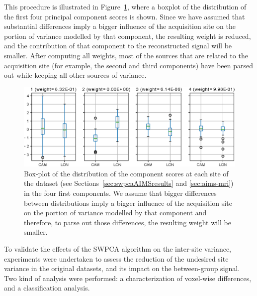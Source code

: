 This procedure is illustrated in Figure~\ref{fig:swpcaboxplot}, where a boxplot of the distribution of the first four principal component scores is shown. Since we have assumed that substantial differences imply a bigger influence of the acquisition site on the portion of variance modelled by that component, the resulting weight is reduced, and the contribution of that component to the reconstructed signal will be smaller. After computing all weights, most of the sources that are related to the acquisition site (for example, the second and third components) have been parsed out while keeping all other sources of variance.

\begin{figure}
	\centering
	\includegraphics[width=\linewidth]{Graphics/ch7/FIGURE02}
	\caption[Box-plot of the distribution of the component scores at each site of the \aimsmri{} dataset (see Sections~\ref{sec:swpcaAIMSresults} and \ref{sec:aims-mri}) in the four first components.]{Box-plot of the distribution of the component scores at each site of the \aimsmri{} dataset (see Sections~\ref{sec:swpcaAIMSresults} and \ref{sec:aims-mri}) in the four first components. We assume that bigger differences between distributions imply a bigger influence of the acquisition site on the portion of variance modelled by that component and therefore, to parse out those differences, the resulting weight will be smaller.}
	\label{fig:swpcaboxplot}
\end{figure}

\label{sec:swpcaEval}
To validate the effects of the \ac{SWPCA} algorithm on the inter-site variance, experiments were undertaken to assess the reduction of the undesired site variance in the original datasets, and its impact on the between-group signal. Two kind of analysis were performed: a characterization of voxel-wise differences, and a classification analysis. 

